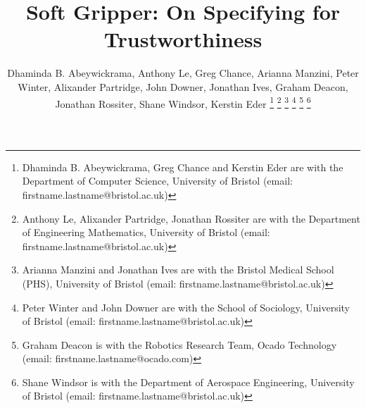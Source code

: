 \documentclass[lettersize,journal]{IEEEtran}
\begin{document}
\linenumbers
\linenumbersep 10pt
\title{Soft Gripper: On Specifying for Trustworthiness}

\author{Dhaminda B. Abeywickrama, Anthony Le, Greg Chance, Arianna Manzini, Peter Winter, Alixander Partridge, John Downer, Jonathan Ives, Graham Deacon, Jonathan Rossiter, Shane Windsor, Kerstin Eder
	\thanks{Dhaminda B. Abeywickrama, Greg Chance and Kerstin Eder are with the Department of Computer Science, University of Bristol (email: firstname.lastname@bristol.ac.uk)}
	\thanks{Anthony Le, Alixander Partridge, Jonathan Rossiter are with the Department of Engineering Mathematics, University of Bristol (email: firstname.lastname@bristol.ac.uk)}
	\thanks{Arianna Manzini and Jonathan Ives are with the Bristol Medical School (PHS), University of Bristol (email: firstname.lastname@bristol.ac.uk)}
	\thanks{Peter Winter and John Downer are with the School of Sociology, University of Bristol (email: firstname.lastname@bristol.ac.uk)}
	\thanks{Graham Deacon is with the Robotics Research Team, Ocado Technology (email: firstname.lastname@ocado.com)}
	\thanks{Shane Windsor is with the Department of Aerospace Engineering, University of Bristol (email: firstname.lastname@bristol.ac.uk)}}
\end{document}
